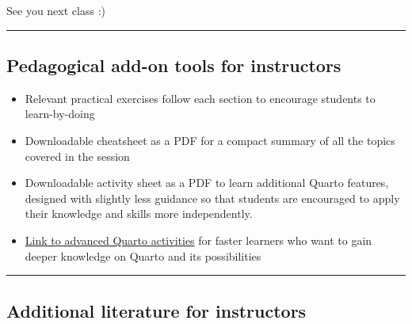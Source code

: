 \documentclass[
  letterpaper,
  DIV=11,
  numbers=noendperiod]{scrartcl}
\providecommand{\tightlist}{%
  \setlength{\itemsep}{0pt}\setlength{\parskip}{0pt}}
\begin{document}
See you next class :)

\begin{center}\rule{0.5\linewidth}{0.5pt}\end{center}

\subsection{Pedagogical add-on tools for
instructors}\label{pedagogical-add-on-tools-for-instructors}

\begin{itemize}
\tightlist
\item
  Relevant practical exercises follow each section to encourage students
  to learn-by-doing
\item
  Downloadable cheatsheet as a PDF for a compact summary of all the
  topics covered in the session
\item
  Downloadable activity sheet as a PDF to learn additional Quarto
  features, designed with slightly less guidance so that students are
  encouraged to apply their knowledge and skills more independently.
\item
  \href{https://lmu-osc.github.io/introduction-to-Quarto/quarto_exercises.html}{Link
  to advanced Quarto activities} for faster learners who want to gain
  deeper knowledge on Quarto and its possibilities
\end{itemize}

\begin{center}\rule{0.5\linewidth}{0.5pt}\end{center}

\subsection{Additional literature for
instructors}\label{additional-literature-for-instructors}
\end{document}
